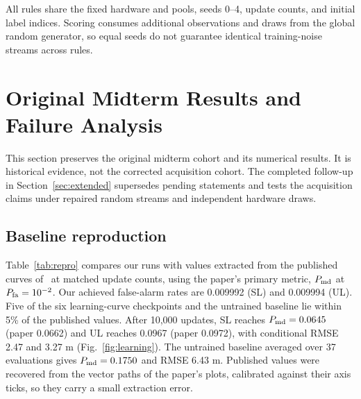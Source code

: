 \documentclass[conference]{IEEEtran}
\begin{document}
All rules share the fixed hardware and pools, seeds 0--4, update counts, and initial label indices. Scoring consumes additional observations and draws from the global random generator, so equal seeds do not guarantee identical training-noise streams across rules.

\section{Original Midterm Results and Failure Analysis}
This section preserves the original midterm cohort and its numerical results. It is historical evidence, not the corrected acquisition cohort. The completed follow-up in Section~\ref{sec:extended} supersedes pending statements and tests the acquisition claims under repaired random streams and independent hardware draws.
\subsection{Baseline reproduction}
Table~\ref{tab:repro} compares our runs with values extracted from the published curves of~\cite{ssl} at matched update counts, using the paper's primary metric, $P_{\rm md}$ at $P_{\rm fa}=10^{-2}$. Our achieved false-alarm rates are 0.009992 (SL) and 0.009994 (UL). Five of the six learning-curve checkpoints and the untrained baseline lie within 5\% of the published values. After 10,000 updates, SL reaches $P_{\rm md}=0.0645$ (paper 0.0662) and UL reaches 0.0967 (paper 0.0972), with conditional RMSE 2.47 and 3.27 m (Fig.~\ref{fig:learning}). The untrained baseline averaged over 37 evaluations gives $P_{\rm md}=0.1750$ and RMSE 6.43 m. Published values were recovered from the vector paths of the paper's plots, calibrated against their axis ticks, so they carry a small extraction error.
\end{document}
